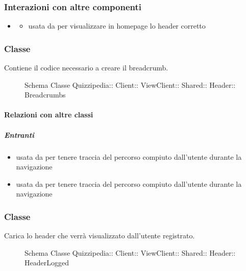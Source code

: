 \subsubsection{Interazioni con altre componenti}
\begin{itemize}
\item {}
\begin{itemize}
\item usata da  per visualizzare in homepage lo header corretto
\end{itemize}
\end{itemize}
\subsubsection{Classe }
Contiene il codice necessario a creare il breadcrumb.
\begin{figure}[H]
\centering
\noindent{}
\caption[Schema Classe Breadcrumbs]{Schema Classe Quizzipedia:: Client:: ViewClient:: Shared:: Header:: Breadcrumbs}
\end{figure}
\paragraph{Relazioni con altre classi}
\subparagraph{Entranti}
\begin{itemize}
\item usata da  per tenere traccia del percorso compiuto dall'utente durante la navigazione
\item usata da  per tenere traccia del percorso compiuto dall'utente durante la navigazione
\end{itemize}
\subsubsection{Classe }
Carica lo header che verrà visualizzato dall'utente registrato.
\begin{figure}[H]
\centering
\noindent{}
\caption[Schema Classe HeaderLogged]{Schema Classe Quizzipedia:: Client:: ViewClient:: Shared:: Header:: HeaderLogged}
\end{figure}
